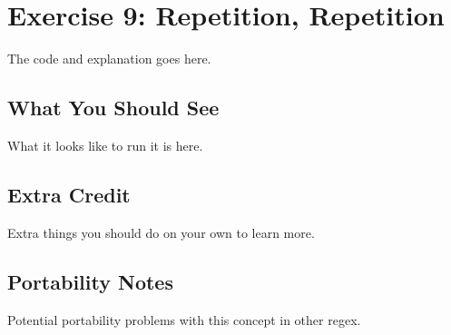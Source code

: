 \chapter{Exercise 9: Repetition, Repetition}


The code and explanation goes here.

\section{What You Should See}

What it looks like to run it is here.

\section{Extra Credit}

Extra things you should do on your own to learn more.

\section{Portability Notes}

Potential portability problems with this concept in other regex.

